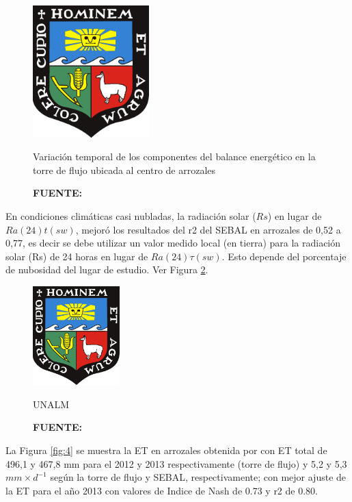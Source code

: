 \begin{figure}[H]
    \centering
    \includegraphics[width=0.4\textwidth]{Cover/Escudo_UNALM.pdf}
    \caption{Variación temporal de los componentes del balance energético en la torre de flujo ubicada al centro de arrozales}
    \captionsetup{labelfont=rm,skip=2pt,textfont=rm,font=small}
        \caption*{\textbf{FUENTE:} \parencite{Lee2016}}
    \label{fig:2}
\end{figure}

En condiciones climáticas casi nubladas, la radiación solar ($Rs$) en lugar de $Ra(24)t(sw)$, mejoró los resultados del r2 del SEBAL en arrozales de 0,52 a 0,77, es decir se debe utilizar un valor medido local (en tierra) para la radiación solar (Rs) de 24 horas en lugar de $Ra(24)\tau (sw)$. Esto depende del porcentaje de nubosidad del lugar de estudio. Ver Figura \ref{fig:3}. 

\begin{figure}[H]
    \centering
    \includegraphics[width=0.3\textwidth]{Cover/Escudo_UNALM.pdf}
    \caption{UNALM}
    \captionsetup{labelfont=rm,skip=2pt,textfont=rm,font=small}
        \caption*{\textbf{FUENTE:} \parencite{Lee2016}}
    \label{fig:3}
\end{figure}
\vspace{-0.6cm}
La Figura \ref{fig:4} se muestra la ET en arrozales obtenida por \parencite{Lee2016} con ET total de 496,1 y 467,8 mm para el 2012 y 2013 respectivamente (torre de flujo) y 5,2 y 5,3 $mm\times d^{-1}$ según la torre de flujo y SEBAL, respectivamente; con mejor ajuste de la ET para el año 2013 con valores de Indice de Nash de 0.73 y r2 de 0.80.

